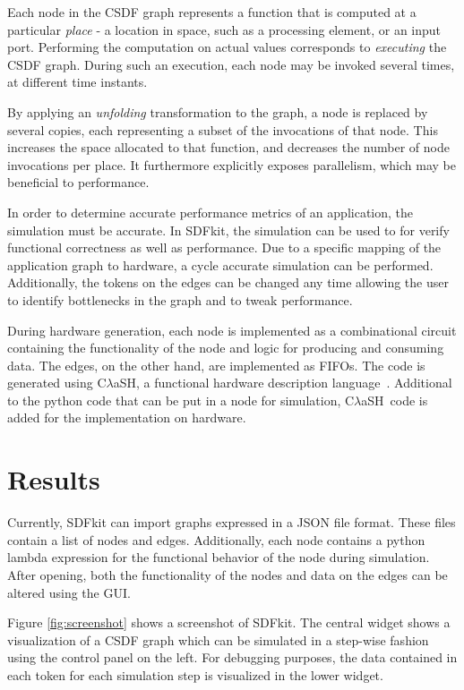 \documentclass[journal]{IEEEtran}
\newcommand{\clash}{C$\lambda$aSH}
\begin{document}
  Each node in the CSDF graph represents a function that is computed at a particular \emph{place} - a location in space, such as a processing element, or an input port.
  Performing the computation on actual values corresponds to \emph{executing} the CSDF graph.
  During such an execution, each node may be invoked several times, at different time instants.

  By applying an \emph{unfolding} transformation to the graph, a node is replaced by several copies, each representing a subset of the invocations of that node.
  This increases the space allocated to that function, and decreases the number of node invocations per place.
  It furthermore explicitly exposes parallelism, which may be beneficial to performance.
  
  In order to determine accurate performance metrics of an application, the simulation must be accurate.
  In SDFkit, the simulation can be used to for verify functional correctness as well as performance.
  Due to a specific mapping of the application graph to hardware, a cycle accurate simulation can be performed.
  Additionally, the tokens on the edges can be changed any time allowing the user to identify bottlenecks in the graph and to tweak performance.
  
  During hardware generation, each node is implemented as a combinational circuit containing the functionality of the node and logic for producing and consuming data.
  The edges, on the other hand, are implemented as FIFOs.
  The code is generated using \clash, a functional hardware description language~\cite{Baaij10}.
  Additional to the python code that can be put in a node for simulation, \clash\ code is added for the implementation on hardware.


\section{Results}
\label{sec:results}

  Currently, SDFkit can import graphs expressed in a JSON file format.
  These files contain a list of nodes and edges.
  Additionally, each node contains a python lambda expression for the functional behavior of the node during simulation.
  After opening, both the functionality of the nodes and data on the edges can be altered using the GUI.

  Figure \ref{fig:screenshot} shows a screenshot of SDFkit.
  The central widget shows a visualization of a CSDF graph which can be simulated in a step-wise fashion using the control panel on the left.
  For debugging purposes, the data contained in each token for each simulation step is visualized in the lower widget.
\end{document}
